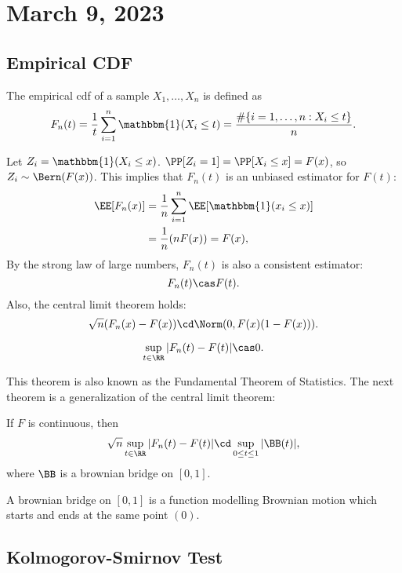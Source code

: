 \section{March 9, 2023}

\subsection{Empirical CDF}

\begin{definition}

The \ac{empirical cdf} of a sample $X_1, \hdots, X_n$ is defined as 
\[F_n(t) = \frac{1}{t}\sum_{i=1}^n\mathbbm{1}(X_i\leq t) = \frac{\#\{i=1, \hdots, n : X_i\leq t\}}{n}.\]
\end{definition}

Let $Z_i = \mathbbm{1}(X_i\leq x)$. $\PP[Z_i=1] = \PP[X_i\leq x] = F(x)$, so $Z_i\sim \Bern(F(x))$. This implies that $F_n(t)$ is an unbiased estimator for $F(t)$: 
\begin{align*}
\EE[F_n(x)] &= \frac{1}{n}\sum_{i=1}^n\EE[\mathbbm{1}(x_i\leq x)]\\
&= \frac{1}{n}(nF(x)) = F(x),
\end{align*}
By the strong law of large numbers, $F_n(t)$ is also a consistent estimator: 
\[F_n(t)\cas F(t).\]
Also, the central limit theorem holds: 
\[\sqrt{n}(F_n(x) - F(x))\cd \Norm(0,F(x)(1-F(x))).\]

\begin{theorem}
\[\sup_{t\in \RR}\vert F_n(t) - F(t)\vert\cas 0.\]
\end{theorem}
This theorem is also known as the \ac{Fundamental Theorem of Statistics}. The next theorem is a generalization of the central limit theorem: 
\begin{theorem}

If $F$ is continuous, then 
\[\sqrt{n}\sup_{t\in \RR}\vert F_n(t) - F(t)\vert \cd \sup_{0\leq t\leq 1}\vert \BB(t)\vert,\]
where $\BB$ is a brownian bridge on $[0,1]$.
\end{theorem}

A brownian bridge on $[0,1]$ is a function modelling Brownian motion which starts and ends at the same point $(0)$. 

\subsection{Kolmogorov-Smirnov Test}

